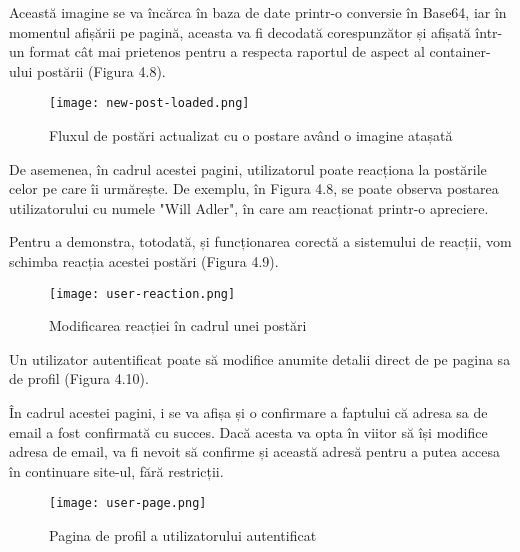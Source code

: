 Această imagine se va încărca în baza de date printr-o conversie în Base64, iar în momentul afișării pe pagină, aceasta va fi decodată corespunzător și afișată într-un format cât mai prietenos pentru a respecta raportul de aspect al container-ului postării (Figura 4.8).\newline
\bigskip

\begin{figure}[H]
	\begin{center}
		\texttt{[image: new-post-loaded.png]}
		\caption{Fluxul de postări actualizat cu o postare având o imagine atașată}
	\end{center}
\end{figure}
\bigskip

De asemenea, în cadrul acestei pagini, utilizatorul poate reacționa la postările celor pe care îi urmărește. De exemplu, în Figura 4.8, se poate observa postarea utilizatorului cu numele "Will Adler", în care am reacționat printr-o apreciere.\newline

Pentru a demonstra, totodată, și funcționarea corectă a sistemului de reacții, vom schimba reacția acestei postări (Figura 4.9).\newline
\bigskip

\begin{figure}[H]
	\begin{center}
		\texttt{[image: user-reaction.png]}
		\caption{Modificarea reacției în cadrul unei postări}
	\end{center}
\end{figure}
\bigskip


Un utilizator autentificat poate să modifice anumite detalii direct de pe pagina sa de profil (Figura 4.10).\newline

În cadrul acestei pagini, i se va afișa și o confirmare a faptului că adresa sa de email a fost confirmată cu succes.\newline
Dacă acesta va opta în viitor să își modifice adresa de email, va fi nevoit să confirme și această adresă pentru a putea accesa în continuare site-ul, fără restricții.\newline
\bigskip

\begin{figure}[H]
	\begin{center}
		\texttt{[image: user-page.png]}
		\caption{Pagina de profil a utilizatorului autentificat}
	\end{center}
\end{figure}
\bigskip

